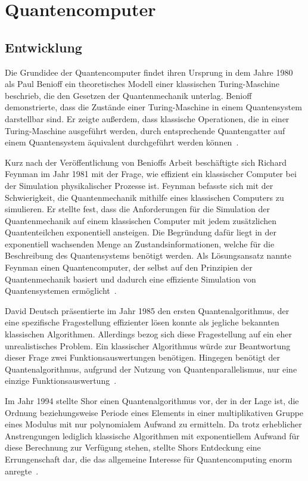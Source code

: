 \section{Quantencomputer}
\subsection{Entwicklung} 
Die Grundidee der Quantencomputer findet ihren Ursprung in dem Jahre 1980 als Paul Benioff ein theoretisches Modell einer klassischen Turing-Maschine beschrieb, 
die den Gesetzen der Quantenmechanik unterlag.
Benioff demonstrierte, dass die Zustände einer Turing-Maschine in einem Quantensystem darstellbar sind. 
Er zeigte außerdem, dass klassische Operationen, die in einer Turing-Maschine ausgeführt werden, 
durch entsprechende Quantengatter auf einem Quantensystem äquivalent durchgeführt werden können~\cite{benioff1980}.

Kurz nach der Veröffentlichung von Benioffs Arbeit beschäftigte sich Richard Feynman im Jahr 1981 mit der Frage,
wie effizient ein klassischer Computer bei der Simulation physikalischer Prozesse ist.
Feynman befasste sich mit der Schwierigkeit, die Quantenmechanik mithilfe eines klassischen Computers zu simulieren.
Er stellte fest, dass die Anforderungen für die Simulation der Quantenmechanik auf einem klassischen Computer mit jedem zusätzlichen Quantenteilchen exponentiell ansteigen.
Die Begründung dafür liegt in der exponentiell wachsenden Menge an Zustandsinformationen,
welche für die Beschreibung des Quantensystems benötigt werden.
Als Lösungsansatz nannte Feynman einen Quantencomputer, 
der selbst auf den Prinzipien der Quantenmechanik basiert und dadurch eine effiziente Simulation von Quantensystemen ermöglicht~\cite{Feynman1982}.

David Deutsch präsentierte im Jahr 1985 den ersten Quantenalgorithmus, 
der eine spezifische Fragestellung effizienter lösen konnte als jegliche bekannten klassischen Algorithmen. 
Allerdings bezog sich diese Fragestellung auf ein eher unrealistisches Problem. 
Ein klassischer Algorithmus würde zur Beantwortung dieser Frage zwei Funktionsauswertungen benötigen. 
Hingegen benötigt der Quantenalgorithmus, 
aufgrund der Nutzung von Quantenparallelismus, 
nur eine einzige Funktionsauswertung~\cite{deutsch1985}.

Im Jahr 1994 stellte Shor einen Quantenalgorithmus vor, der in der Lage ist, 
die Ordnung beziehungsweise Periode eines Elements in einer multiplikativen Gruppe eines Modulus mit nur polynomialem Aufwand zu ermitteln. 
Da trotz erheblicher Anstrengungen lediglich klassische Algorithmen mit exponentiellem Aufwand für diese Berechnung zur Verfügung stehen, 
stellte Shors Entdeckung eine Errungenschaft dar, die das allgemeine Interesse für Quantencomputing enorm anregte~\cite{Shor_1997}.

